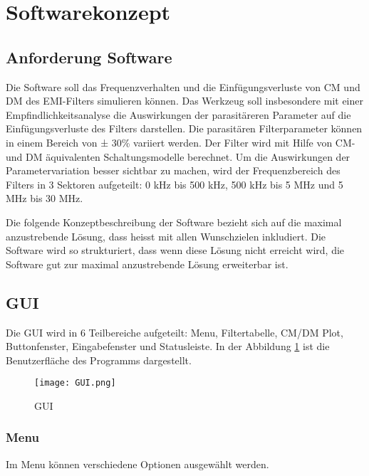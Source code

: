 \section{Softwarekonzept} \label{sec:softwarekonzept}

\subsection{Anforderung Software} \label{subsec:anforderungSoftware}

Die Software soll das Frequenzverhalten und die Einfügungsverluste von CM und DM des EMI-Filters simulieren können. Das Werkzeug soll insbesondere mit einer Empfindlichkeitsanalyse die Auswirkungen der parasitäreren Parameter auf die Einfügungsverluste des Filters darstellen. Die parasitären Filterparameter können in einem Bereich von ± 30\% variiert werden. Der Filter wird mit Hilfe von CM- und DM äquivalenten Schaltungsmodelle berechnet. Um die Auswirkungen der Parametervariation besser sichtbar zu machen, wird der Frequenzbereich des Filters in 3 Sektoren aufgeteilt: 0 kHz bis 500 kHz, 500 kHz bis 5 MHz und 5 MHz bis 30 MHz. 

Die folgende Konzeptbeschreibung der Software bezieht sich auf die maximal anzustrebende Lösung, dass heisst mit allen Wunschzielen inkludiert. Die Software wird so strukturiert, dass wenn diese Lösung nicht erreicht wird, die Software gut zur  maximal anzustrebende Lösung erweiterbar ist.

\subsection{GUI} \label{subsec:GUI}

Die GUI wird in 6 Teilbereiche aufgeteilt: Menu, Filtertabelle, CM/DM Plot, Buttonfenster, Eingabefenster und Statusleiste. In der Abbildung \ref{fig:GUI}  ist die Benutzerfläche des Programms dargestellt.

\begin{figure}[H]
	\centering
	\texttt{[image: GUI.png]}
	\caption{GUI}
	\label{fig:GUI}
\end{figure}

\newpage

\subsubsection{Menu} \label{subsubsec:menu}

Im Menu können verschiedene Optionen ausgewählt werden. 
\bigskip

